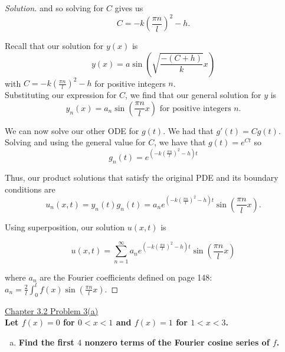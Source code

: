 \documentclass[11pt]{article}
\newenvironment{solution}
  {\renewcommand\qedsymbol{$\blacksquare$}\begin{proof}[Solution]}
  {\end{proof}}
\begin{document}
\begin{solution}
  and so solving for $C$ gives us \[C = -k\left( \frac{\pi n}{l} \right)^2 - h.\]
  
  Recall that our solution for $y(x)$ is \[y(x) =  a\sin\left(\sqrt{\frac{-(C+h)}{k}}x\right)\]
  with $C = -k\left( \frac{\pi n}{l} \right)^2 - h$ for positive integers $n$. \\
  
  Substituting our expression for $C$, we find that our general solution for $y$ is 
  \[ y_n(x) = a_n \sin\left(\frac{\pi n}{l}x\right) \text { for positive integers } n.\]
  
  We can now solve our other ODE for $g(t)$. We had that $g'(t) = Cg(t)$. Solving and using the general value for $C$, we have that $g(t) = e^{Ct}$ so 
  \[ g_n(t) = e^{\left(-k\left( \frac{\pi n}{l} \right)^2 - h\right)t}\]
  
  Thus, our product solutions that satisfy the original PDE and its boundary conditions are 
  \[ u_n(x, t) = y_n(t) g_n(t) = a_ne^{\left(-k\left( \frac{\pi n}{l} \right)^2 - h\right)t} \sin\left(\frac{\pi n}{l} x\right). \]
  
  Using superposition, our solution $u(x, t)$ is 
  
  \[ \boxed{u(x, t) = \sum\limits_{n=1}^{\infty} a_ne^{\left(-k\left( \frac{\pi n}{l} \right)^2 - h\right)t} \sin\left(\frac{\pi n}{l} x\right)}\]
  
  where $a_n$ are the Fourier coefficients defined on page 148: $a_n = \frac{2}{l}\int_0^l f(x) \sin\left(\frac{\pi n}{l} x \right).$
  
  \end{solution}
\newpage

\underline{Chapter 3.2 Problem 3(a)} \\

\textbf{Let $f(x)=0$ for $0<x<1$ and $f(x)=1$ for $1<x<3$.}
\begin{enumerate}[a)] 
    \item \textbf{Find the first $4$ nonzero terms of the Fourier cosine series of $f$.}
  
\end{enumerate}
\end{document}
